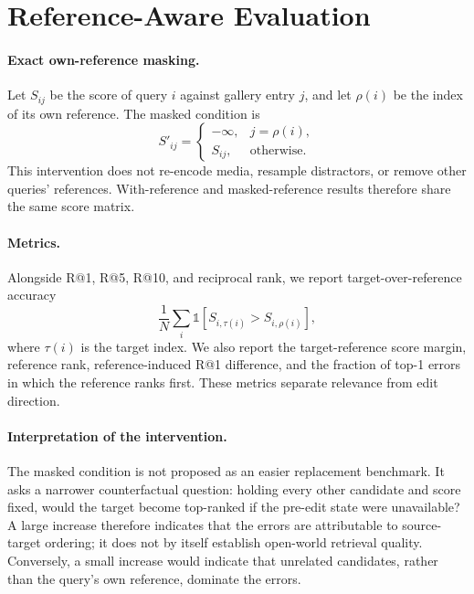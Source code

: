 \documentclass[letterpaper]{article}
\begin{document}
\section{Reference-Aware Evaluation}

\paragraph{Exact own-reference masking.}
Let $S_{ij}$ be the score of query $i$ against gallery entry $j$, and let $\rho(i)$ be the index of its own reference.
The masked condition is
\begin{equation}
  S'_{ij} =
  \begin{cases}
    -\infty, & j=\rho(i),\\
    S_{ij}, & \text{otherwise}.
  \end{cases}
\end{equation}
This intervention does not re-encode media, resample distractors, or remove other queries' references.
With-reference and masked-reference results therefore share the same score matrix.

\paragraph{Metrics.}
Alongside R@1, R@5, R@10, and reciprocal rank, we report target-over-reference accuracy
\begin{equation}
  \frac{1}{N}\sum_i \mathbb{1}[S_{i,\tau(i)} > S_{i,\rho(i)}],
\end{equation}
where $\tau(i)$ is the target index.
We also report the target-reference score margin, reference rank, reference-induced R@1 difference, and the fraction of top-1 errors in which the reference ranks first.
These metrics separate relevance from edit direction.

\paragraph{Interpretation of the intervention.}
The masked condition is not proposed as an easier replacement benchmark.
It asks a narrower counterfactual question: holding every other candidate and score fixed, would the target become top-ranked if the pre-edit state were unavailable?
A large increase therefore indicates that the errors are attributable to source-target ordering; it does not by itself establish open-world retrieval quality.
Conversely, a small increase would indicate that unrelated candidates, rather than the query's own reference, dominate the errors.
\end{document}
